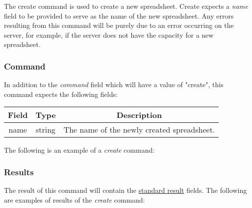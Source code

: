 The create command is used to create a new spreadsheet. Create expects a \emph{name} 
field to be provided to serve as the name of the new spreadsheet. Any errors 
resulting from this command will be purely due to an error occurring on the 
server, for example, if the server does not have the capacity for a new 
spreadsheet.

\subsubsection{Command}

In addition to the \emph{command} field which will have a value of "create", this command expects the following fields:
\begin{table}[h!]
    \begin{center}
        \begin{tabular}{|c|c|c|}\hline
            Field & Type & Description \\\hline
            name & string & The name of the newly created spreadsheet. \\\hline
        \end{tabular}
    \end{center}
\end{table}

The following is an example of a \emph{create} command:


\subsubsection{Results}
The result of this command will contain the \hyperref[sec:message:result]{standard result} fields.
The following are examples of results of the \emph{create} command:




